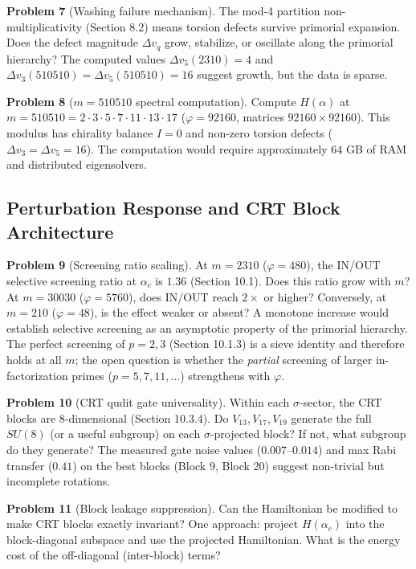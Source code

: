 \documentclass[11pt,letterpaper]{article}
\theoremstyle{definition}
\theoremstyle{remark}
\begin{document}
\textbf{Problem 7} (Washing failure mechanism). The mod-4 partition non-multiplicativity (Section 8.2) means torsion defects survive primorial expansion. Does the defect magnitude $\Delta v_q$ grow, stabilize, or oscillate along the primorial hierarchy? The computed values $\Delta v_5(2310) = 4$ and $\Delta v_3(510510) = \Delta v_5(510510) = 16$ suggest growth, but the data is sparse.

\textbf{Problem 8} ($m = 510510$ spectral computation). Compute $H(\alpha)$ at $m = 510510 = 2 \cdot 3 \cdot 5 \cdot 7 \cdot 11 \cdot 13 \cdot 17$ ($\varphi = 92160$, matrices $92160 \times 92160$). This modulus has chirality balance $I = 0$ and non-zero torsion defects ($\Delta v_3 = \Delta v_5 = 16$). The computation would require approximately $64$ GB of RAM and distributed eigensolvers.

\subsection{Perturbation Response and CRT Block Architecture}\label{perturbation-response-and-crt-block-architecture}

\textbf{Problem 9} (Screening ratio scaling). At $m = 2310$ ($\varphi = 480$), the IN/OUT selective screening ratio at $\alpha_c$ is $1.36$ (Section 10.1). Does this ratio grow with $m$? At $m = 30030$ ($\varphi = 5760$), does IN/OUT reach $2\times$ or higher? Conversely, at $m = 210$ ($\varphi = 48$), is the effect weaker or absent? A monotone increase would establish selective screening as an asymptotic property of the primorial hierarchy. The perfect screening of $p = 2, 3$ (Section 10.1.3) is a sieve identity and therefore holds at all $m$; the open question is whether the \emph{partial} screening of larger in-factorization primes ($p = 5, 7, 11, \ldots$) strengthens with $\varphi$.

\textbf{Problem 10} (CRT qudit gate universality). Within each $\sigma$-sector, the CRT blocks are 8-dimensional (Section 10.3.4). Do $V_{13}, V_{17}, V_{19}$ generate the full $SU(8)$ (or a useful subgroup) on each $\sigma$-projected block? If not, what subgroup do they generate? The measured gate noise values ($0.007$--$0.014$) and max Rabi transfer ($0.41$) on the best blocks (Block 9, Block 20) suggest non-trivial but incomplete rotations.

\textbf{Problem 11} (Block leakage suppression). Can the Hamiltonian be modified to make CRT blocks exactly invariant? One approach: project $H(\alpha_c)$ into the block-diagonal subspace and use the projected Hamiltonian. What is the energy cost of the off-diagonal (inter-block) terms?
\end{document}

